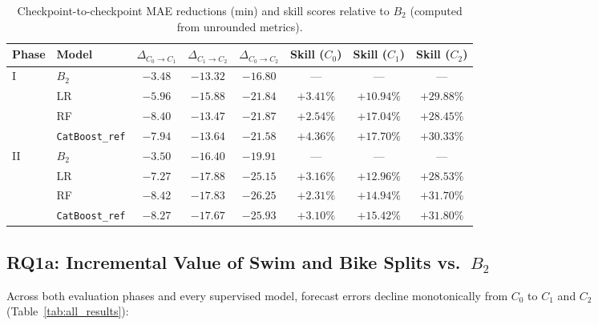 \documentclass[11pt,a4paper]{article}
\begin{document}
\begin{table}[htbp]
\centering
\small
\caption{Checkpoint-to-checkpoint MAE reductions (min) and skill
scores relative to $B_2$ (computed from unrounded metrics).}
\label{tab:transitions}
\renewcommand{\arraystretch}{1.15}
\begin{tabular}{llcccccc}
\toprule
\textbf{Phase} & \textbf{Model}
  & $\Delta_{C_0\to C_1}$ & $\Delta_{C_1\to C_2}$ & $\Delta_{C_0\to C_2}$
  & \textbf{Skill ($C_0$)} & \textbf{Skill ($C_1$)} & \textbf{Skill ($C_2$)} \\
\midrule
\multirow{4}{*}{I}
  & $B_2$                  & $-3.48$ & $-13.32$ & $-16.80$ & ---      & ---       & ---       \\
  & LR                     & $-5.96$ & $-15.88$ & $-21.84$ & $+3.41\%$ & $+10.94\%$ & $+29.88\%$ \\
  & RF                     & $-8.40$ & $-13.47$ & $-21.87$ & $+2.54\%$ & $+17.04\%$ & $+28.45\%$ \\
  & \texttt{CatBoost\_ref} & $-7.94$ & $-13.64$ & $-21.58$ & $+4.36\%$ & $+17.70\%$ & $+30.33\%$ \\
\midrule
\multirow{4}{*}{II}
  & $B_2$                  & $-3.50$ & $-16.40$ & $-19.91$ & ---      & ---       & ---       \\
  & LR                     & $-7.27$ & $-17.88$ & $-25.15$ & $+3.16\%$ & $+12.96\%$ & $+28.53\%$ \\
  & RF                     & $-8.42$ & $-17.83$ & $-26.25$ & $+2.31\%$ & $+14.94\%$ & $+31.70\%$ \\
  & \texttt{CatBoost\_ref} & $-8.27$ & $-17.67$ & $-25.93$ & $+3.10\%$ & $+15.42\%$ & $+31.80\%$ \\
\bottomrule
\end{tabular}
\end{table}

\subsection{RQ1a: Incremental Value of Swim and Bike Splits vs.\ $B_2$}

Across both evaluation phases and every supervised model, forecast
errors decline monotonically from $C_0$ to $C_1$ and $C_2$
(Table~\ref{tab:all_results}):
\end{document}
